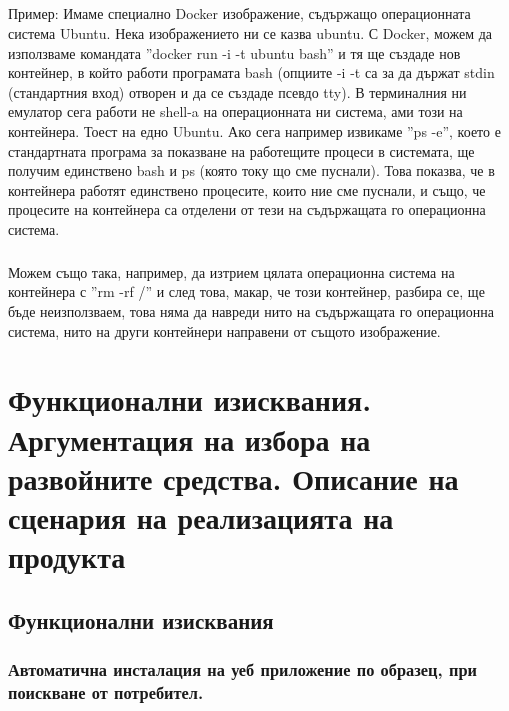 \documentclass[pdftex,14pt,a4paper]{extreport}
\begin{document}
\paragraph {}

Пример: Имаме специално Docker изображение, съдържащо операционната система Ubuntu. Нека изображението ни се казва ubuntu. С Docker, можем да използваме командата ''docker run -i -t ubuntu bash'' и тя ще създаде нов контейнер, в който работи програмата bash (опциите -i -t са за да държат stdin (стандартния вход) отворен и да се създаде псевдо tty). В терминалния ни емулатор сега работи не shell-a на операционната ни система, ами този на контейнера. Тоест на едно Ubuntu. Ако сега например извикаме ''ps -e'', което е стандартната програма за показване на работещите процеси в системата, ще получим единствено bash и ps (която току що сме пуснали). Това показва, че в контейнера работят единствено процесите, които ние сме пуснали, и също, че процесите на контейнера са отделени от тези на съдържащата го операционна система.

\paragraph {}

Можем също така, например, да изтрием цялата операционна система на контейнера с ''rm -rf /'' и след това, макар, че този контейнер, разбира се, ще бъде неизползваем, това няма да навреди нито на съдържащата го операционна система, нито на други контейнери направени от същото изображение.
\newpage
\clearpage
\chapter {Функционални изисквания. Аргументация на избора на развойните средства. Описание на сценария на реализацията на продукта}
\section {Функционални изисквания}
\subsection {Автоматична инсталация на уеб приложение по образец, при поискване от потребител.}
\end{document}
